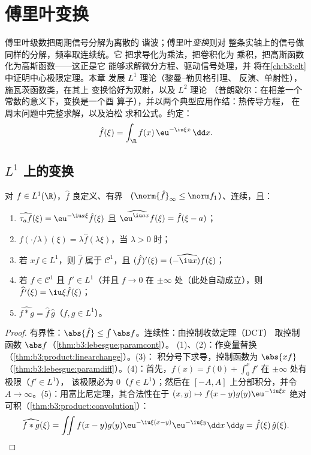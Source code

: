 \chapter{傅里叶变换}\label{ch:b3:fouriertransform}

傅里叶级数把周期信号分解为离散的
谐波；傅里叶\emph{变换}则对
整条实轴上的信号做同样的分解，频率取连续统。它
把求导化为乘法，把卷积化为
乘积，把高斯函数化为高斯函数——这正是它
能够求解微分方程、驱动信号处理，并
将在\cref{ch:b3:clt}中证明中心极限定理。本章
发展 $L^1$ 理论（黎曼–勒贝格引理、
反演、单射性），施瓦茨函数类，在其上
变换恰好为双射，以及 $L^2$ 理论
（普朗歇尔：在相差一个常数的意义下，变换是一个酉
算子），并以两个典型应用作结：热传导方程，
在周末问题中完整求解，以及泊松
求和公式。约定：
\[
\hat f(\xi) = \int_\R f(x)\,\eu^{-\iu\xi x}\,\dd x .
\]

\section{\texorpdfstring{$L^1$ 上的变换}{L1 上的变换}}

\begin{proposition}\label{prop:b3:fouriertransform:basic}
对 $f \in L^1(\R)$，$\hat f$ 良定义、有界
（$\norm{\hat f}_\infty \leq \norm f_1$）、连续，且：
\begin{enumerate}
  \item $\widehat{\tau_af}(\xi) = \eu^{-\iu a\xi}\hat f(\xi)$
        且 $\widehat{\eu^{\iu ax}f}(\xi) = \hat f(\xi - a)$；
  \item $\widehat{f(\cdot/\lambda)}(\xi) = \lambda\hat
        f(\lambda\xi)$，当 $\lambda > 0$ 时；
  \item 若 $xf \in L^1$，则 $\hat f$ 属于 $\mathcal C^1$，且
        $(\hat f)'(\xi) = \widehat{(-\iu x)f}(\xi)$；
  \item 若 $f \in \mathcal C^1$ 且 $f' \in L^1$（并且 $f \to
        0$ 在 $\pm\infty$ 处（此处自动成立），则
        $\widehat{f'}(\xi) = \iu\xi\hat f(\xi)$；
  \item $\widehat{f * g} = \hat f\,\hat g$（$f, g \in L^1$）。
\end{enumerate}
\end{proposition}

\begin{proof}
有界性：$\abs{\hat f} \leq \int\abs f$。连续性：由控制收敛定理（DCT）
取控制函数 $\abs f$（\cref{thm:b3:lebesgue:paramcont}）。
(1)、(2)：作变量替换
（\cref{thm:b3:product:linearchange}）。(3)：
积分号下求导，控制函数为 $\abs{xf}$
（\cref{thm:b3:lebesgue:paramdiff}）。(4)：首先，$f(x) = f(0)
+ \int_0^xf'$ 在 $\pm\infty$ 处有极限（$f' \in L^1$），
该极限必为 $0$（$f \in L^1$）；然后在 $[-A,
A]$ 上分部积分，并令 $A \to \infty$。(5)：用富比尼定理，其合法性在于
$(x,y)\mapsto f(x - y)g(y)\eu^{-\iu\xi x}$ 绝对
可积（\cref{thm:b3:product:convolution}）：
\[
\widehat{f*g}(\xi) = \iint f(x - y)g(y)\eu^{-\iu\xi(x - y)}
\eu^{-\iu\xi y}\dd x\,\dd y = \hat f(\xi)\,\hat g(\xi).
\]
\end{proof}


